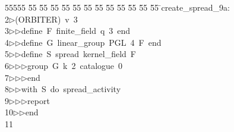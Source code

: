 %
%
\begin{tabbing}
55555 \= 55 \= 55 \= 55 \= 55 \= 55 \= 55 \= 55 \= 55 \= 55 \= 55 \= 55 \= 55 \= \>create\_spread\_9a:\\[0pt]
2\>$\triangleright$\>(ORBITER)\ v\ 3\ \\[0pt]
3\>$\triangleright$\>$\triangleright$\>define\ F\ finite\_field\ q\ 3\ end\ \\[0pt]
4\>$\triangleright$\>$\triangleright$\>define\ G\ linear\_group\ PGL\ 4\ F\ end\ \\[0pt]
5\>$\triangleright$\>$\triangleright$\>define\ S\ spread\ kernel\_field\ F\ \\[0pt]
6\>$\triangleright$\>$\triangleright$\>$\triangleright$\>group\ G\ k\ 2\ catalogue\ 0\ \\[0pt]
7\>$\triangleright$\>$\triangleright$\>$\triangleright$\>end\ \\[0pt]
8\>$\triangleright$\>$\triangleright$\>with\ S\ do\ spread\_activity\ \\[0pt]
9\>$\triangleright$\>$\triangleright$\>$\triangleright$\>report\ \\[0pt]
10\>$\triangleright$\>$\triangleright$\>end\\[0pt]
11\>\end{tabbing}
